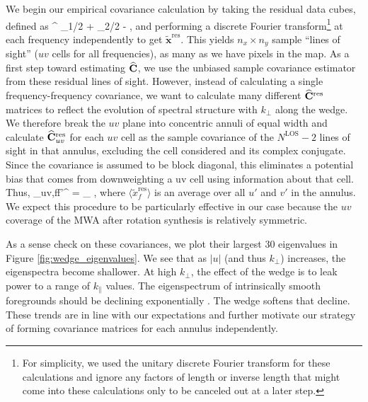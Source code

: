 We begin our empirical covariance calculation by taking the residual data cubes, defined as
\beq
\xhat^ \equiv \xhat_1/2 + \xhat_2/2 - \mean,
\eeq
and performing a discrete Fourier transform\footnote{For simplicity, we used the unitary discrete Fourier transform for these calculations and ignore any factors of length or inverse length that might come into these calculations only to be canceled out at a later step.} at each frequency independently to get $\widetilde{\mathbf{x}}^\text{res}$. This yields $n_x\times n_y$ sample ``lines of sight'' ($uv$ cells for all frequencies), as many as we have pixels in the map. As a first step toward estimating $\widehat{\mathbf{C}}$, we use the unbiased sample covariance estimator from these residual lines of sight. However, instead of calculating a single frequency-frequency covariance, we want to calculate many different $\widehat{\mathbf{C}}^\text{res}$ matrices to reflect the evolution of spectral structure with $k_\perp$ along the wedge. We therefore break the $uv$ plane into concentric annuli of equal width and calculate $\widehat{\mathbf{C}}^\text{res}_{uv}$ for each $uv$ cell as the sample covariance of the $N^\text{LOS} - 2$ lines of sight in that annulus, excluding the cell considered and its complex conjugate. Since the covariance is assumed to be block diagonal, this eliminates a potential bias that comes from downweighting a uv cell using information about that cell. Thus,
\beq
{}_{uv,ff'}^ = \hspace{-3mm}\sum_{} \hspace{-3mm} , \label{eq:CovEstOtherAnnuli}
\eeq
where $\langle \widetilde{x}^\text{res}_f \rangle$ is an average over all $u'$ and $v'$ in the annulus. We expect this procedure to be particularly effective in our case because the $uv$ coverage of the MWA after rotation synthesis is relatively symmetric.

As a sense check on these covariances, we plot their largest 30 eigenvalues in Figure \ref{fig:wedge_eigenvalues}. We see that as $|u|$ (and thus $k_\perp$) increases, the eigenspectra become shallower. At high $k_\perp$, the effect of the wedge is to leak power to a range of $k_\|$ values. The eigenspectrum of intrinsically smooth foregrounds should be declining exponentially \citep{AdrianForegrounds}. The wedge softens that decline. These trends are in line with our expectations and further motivate our strategy of forming covariance matrices for each annulus independently. 

